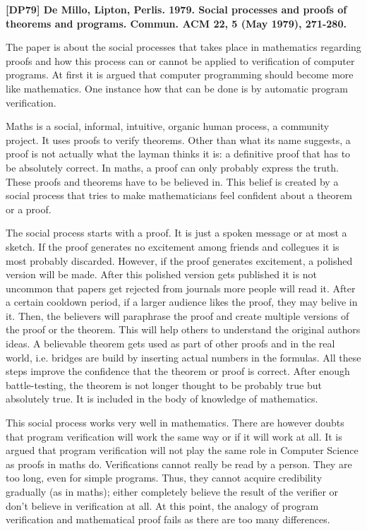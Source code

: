 \documentclass[a4paper,12pt,english]{scrartcl}
\newcommand{\papertitle}[2]{
	\noindent
	\textbf{\textsf{{\large
		[#1] #2
	}}}
	\vspace{2mm}
}
\begin{document}
\pagestyle{fancy} %

\papertitle{DP79}{De Millo, Lipton, Perlis. 1979. Social processes and proofs of
				  theorems and programs. Commun. ACM 22, 5 (May 1979), 271-280.}

The paper is about the social processes that takes place in mathematics
regarding proofs and how this process can or cannot be applied to verification
of computer programs. At first it is argued that computer programming should
become more like mathematics. One instance how that can be done is by automatic
program verification.

Maths is a social, informal, intuitive, organic human process, a community
project. It uses proofs to verify theorems. Other than what its name suggests,
a proof is not actually what the layman thinks it is: a definitive proof that
has to be absolutely correct. In maths, a proof can only probably express the
truth. These proofs and theorems have to be believed in. This belief is created
by a social process that tries to make mathematicians feel confident about a
theorem	or a proof.

The social process starts with a proof. It is just a spoken message or at most
a sketch. If the proof generates no excitement among friends and collegues it is
most probably discarded. However, if the proof generates excitement, a
polished version will be made. After this polished version gets
published \textemdash{} it is not uncommon that papers get rejected from
journals \textemdash{} more people will read it. After a certain cooldown
period, if a larger audience likes the proof, they may belive in it. Then,
the believers will paraphrase the proof and create multiple versions of the
proof or the theorem. This will help others to understand the original authors
ideas. A believable theorem gets used as part of other proofs and in the real
world, i.e. bridges are build by inserting actual numbers in the formulas. All
these steps improve the confidence that the theorem or proof is correct. After
enough battle-testing, the theorem is not longer thought to be probably true but
absolutely true. It is included in the body of knowledge of mathematics.

This social process works very well in mathematics. There are however doubts
that program verification will work the same way or if it will work at all. It
is argued that program verification will not play the same role in Computer
Science as proofs in maths do. Verifications cannot really be read by a person.
They are too long, even for simple programs. Thus, they cannot acquire
credibility gradually (as in maths); either completely believe the result of the
verifier or don't believe in verification at all. At this point, the analogy of
program verification and mathematical proof fails as there are too many
differences.
\end{document}
